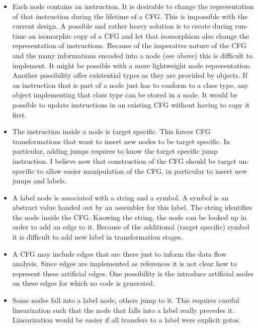 \documentclass[11pt]{article}
\newcommand\CFG{{\small CFG}}
\begin{document}
\begin{itemize}
    \item Each node contains an instruction. It is desirable to change
    the representation of that instruction during the lifetime of a
    {\CFG}. This is impossible with the current design. A possible and
    rather heavy solution is to create during run-time an isomorphic
    copy of a {\CFG} and let that isomorphism also change the
    representation of instructions. Because of the imperative nature of
    the {\CFG} and the many informations encoded into a node (see above)
    this is difficult to implement. It might be possible with a more
    lightweight node representation. Another possibility offer
    existential types as they are provided by objects. If an instruction
    that is part of a node just has to conform to a class type, any
    object implementing that class type can be stored in a node. It
    would be possible to update instructions in an existing {\CFG}
    without having to copy it first.

    \item The instruction inside a node is target specific. This forces
    {\CFG} transformations that want to insert new nodes to be target
    specific. In particular, adding jumps requires to know the target
    specific jump instruction. I believe now that construction of the
    {\CFG} should be target un-specific to allow easier manipulation of
    the {\CFG}, in particular to insert new jumps and labels.

    \item A label node is associated with a string and a symbol. A
    symbol is an abstract value handed out by an assembler for this
    label. The string identifies the node inside the {\CFG}. Knowing the
    string, the node can be looked up in order to add an edge to it.
    Because of the additional (target specific) symbol it is difficult
    to add new label in transformation stages. 
    
    \item A {\CFG} may include edges that are there just to inform the
    data flow analysis. Since edges are implemented as references it is
    not clear how to represent these artificial edges. One possibility
    is the introduce artificial nodes on these edges for which no code
    is generated.
    
    \item Some nodes fall into a label node, others jump to it. This
    requires careful linearization such that the node that falls into a
    label really precedes it. Linearization would be easier if all
    transfers to a label were explicit gotos. 
    
    \end{itemize}
    
\end{document}
